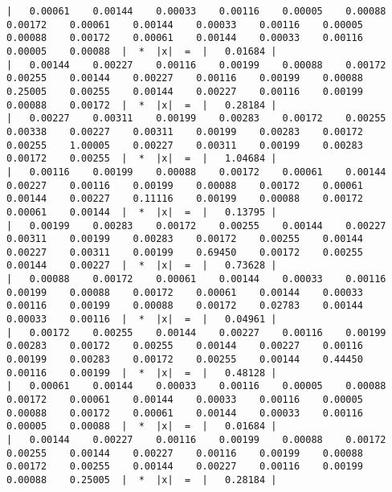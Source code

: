 \documentclass[a4paper,12pt,titlepage,finall]{article}
\begin{document}
\begin{verbatim}
|   0.00061    0.00144    0.00033    0.00116    0.00005    0.00088    0.00172    0.00061    0.00144    0.00033    0.00116    0.00005    0.00088    0.00172    0.00061    0.00144    0.00033    0.00116    0.00005    0.00088  |  *  |x|  =  |   0.01684 |
|   0.00144    0.00227    0.00116    0.00199    0.00088    0.00172    0.00255    0.00144    0.00227    0.00116    0.00199    0.00088    0.25005    0.00255    0.00144    0.00227    0.00116    0.00199    0.00088    0.00172  |  *  |x|  =  |   0.28184 |
|   0.00227    0.00311    0.00199    0.00283    0.00172    0.00255    0.00338    0.00227    0.00311    0.00199    0.00283    0.00172    0.00255    1.00005    0.00227    0.00311    0.00199    0.00283    0.00172    0.00255  |  *  |x|  =  |   1.04684 |
|   0.00116    0.00199    0.00088    0.00172    0.00061    0.00144    0.00227    0.00116    0.00199    0.00088    0.00172    0.00061    0.00144    0.00227    0.11116    0.00199    0.00088    0.00172    0.00061    0.00144  |  *  |x|  =  |   0.13795 |
|   0.00199    0.00283    0.00172    0.00255    0.00144    0.00227    0.00311    0.00199    0.00283    0.00172    0.00255    0.00144    0.00227    0.00311    0.00199    0.69450    0.00172    0.00255    0.00144    0.00227  |  *  |x|  =  |   0.73628 |
|   0.00088    0.00172    0.00061    0.00144    0.00033    0.00116    0.00199    0.00088    0.00172    0.00061    0.00144    0.00033    0.00116    0.00199    0.00088    0.00172    0.02783    0.00144    0.00033    0.00116  |  *  |x|  =  |   0.04961 |
|   0.00172    0.00255    0.00144    0.00227    0.00116    0.00199    0.00283    0.00172    0.00255    0.00144    0.00227    0.00116    0.00199    0.00283    0.00172    0.00255    0.00144    0.44450    0.00116    0.00199  |  *  |x|  =  |   0.48128 |
|   0.00061    0.00144    0.00033    0.00116    0.00005    0.00088    0.00172    0.00061    0.00144    0.00033    0.00116    0.00005    0.00088    0.00172    0.00061    0.00144    0.00033    0.00116    0.00005    0.00088  |  *  |x|  =  |   0.01684 |
|   0.00144    0.00227    0.00116    0.00199    0.00088    0.00172    0.00255    0.00144    0.00227    0.00116    0.00199    0.00088    0.00172    0.00255    0.00144    0.00227    0.00116    0.00199    0.00088    0.25005  |  *  |x|  =  |   0.28184 |


\end{verbatim}
\end{document}
